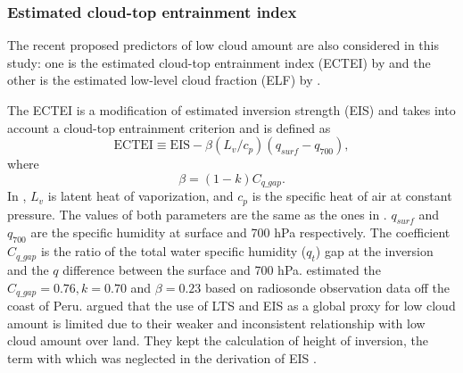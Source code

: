 \subsubsection{Estimated cloud-top entrainment index}
The recent proposed predictors of low cloud amount are also considered in this study: one is the estimated cloud-top entrainment index (ECTEI) by \cite{Kawai2017} and the other is the estimated low-level cloud fraction (ELF) by \cite{Park2019}. 

The ECTEI is a modification of estimated inversion strength (EIS) and takes into account a cloud-top entrainment criterion and is defined as
\begin{equation}
    \mathrm{ECTEI} \equiv \mathrm{EIS} - \beta\left(L_v / c_{p}\right)\left(q_{surf}-q_{700}\right),
    \label{eq:ectei_Kawai}
\end{equation}
where
\begin{equation}
    \beta=(1-k) C_{q\_gap}.
\end{equation}
In , $L_v$ is latent heat of vaporization, and $c_p$ is the specific heat of air at constant pressure. The values of both parameters are the same as the ones in  . $q_{surf}$ and $q_{700}$ are the specific humidity at surface and 700 hPa respectively. The coefficient $C_{q\_gap}$ is the ratio of the total water specific humidity ($q_t$) gap at
the inversion and the $q$ difference between the surface
and 700 hPa. \cite{Kawai2017} estimated the $C_{q\_gap} = 0.76, k=0.70 $ and $\beta = 0.23$ based on radiosonde observation data off the coast of Peru. 
\cite{Park2019} argued that the use of LTS and EIS as a global proxy for low cloud amount is limited
due to their weaker and inconsistent relationship with low cloud amount over land. They kept the calculation of height of inversion, the term with which was neglected in the derivation of EIS \citep{Wood2006}. 